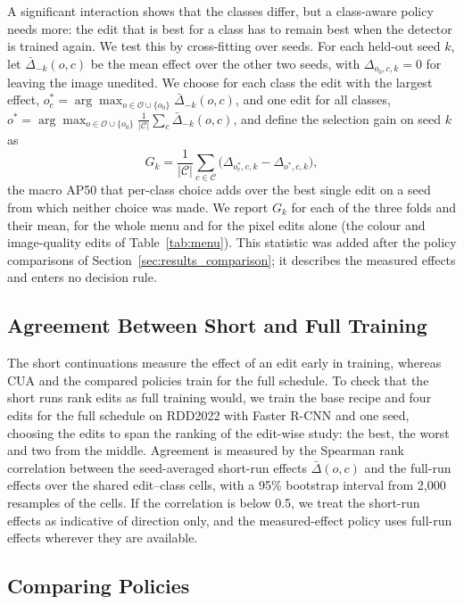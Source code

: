 \documentclass[conference]{IEEEtran}
\begin{document}
A significant interaction shows that the classes differ, but a class-aware policy needs more: the edit that is best for a class has to remain best when the detector is trained again. We test this by cross-fitting over seeds. For each held-out seed $k$, let $\bar\Delta_{-k}(o,c)$ be the mean effect over the other two seeds, with $\Delta_{o_0,c,k}=0$ for leaving the image unedited. We choose for each class the edit with the largest effect, $o^\ast_c=\arg\max_{o\in\mathcal{O}\cup\{o_0\}}\bar\Delta_{-k}(o,c)$, and one edit for all classes, $o^\ast=\arg\max_{o\in\mathcal{O}\cup\{o_0\}}\frac{1}{|\mathcal{C}|}\sum_{c}\bar\Delta_{-k}(o,c)$, and define the selection gain on seed $k$ as
\begin{equation}
G_k=\frac{1}{|\mathcal{C}|}\sum_{c\in\mathcal{C}}\bigl(\Delta_{o^\ast_c,c,k}-\Delta_{o^\ast,c,k}\bigr),
\label{eq:crossfit}
\end{equation}
the macro AP50 that per-class choice adds over the best single edit on a seed from which neither choice was made. We report $G_k$ for each of the three folds and their mean, for the whole menu and for the pixel edits alone (the colour and image-quality edits of Table~\ref{tab:menu}). This statistic was added after the policy comparisons of Section~\ref{sec:results_comparison}; it describes the measured effects and enters no decision rule.


\subsection{Agreement Between Short and Full Training}
\label{sec:measure_proxy}

The short continuations measure the effect of an edit early in training, whereas CUA and the compared policies train for the full schedule. To check that the short runs rank edits as full training would, we train the base recipe and four edits for the full schedule on RDD2022 with Faster R-CNN and one seed, choosing the edits to span the ranking of the edit-wise study: the best, the worst and two from the middle. Agreement is measured by the Spearman rank correlation between the seed-averaged short-run effects $\bar\Delta(o,c)$ and the full-run effects over the shared edit--class cells, with a 95\% bootstrap interval from 2,000 resamples of the cells. If the correlation is below 0.5, we treat the short-run effects as indicative of direction only, and the measured-effect policy uses full-run effects wherever they are available.

\subsection{Comparing Policies}
\label{sec:setup_metrics}
\end{document}
